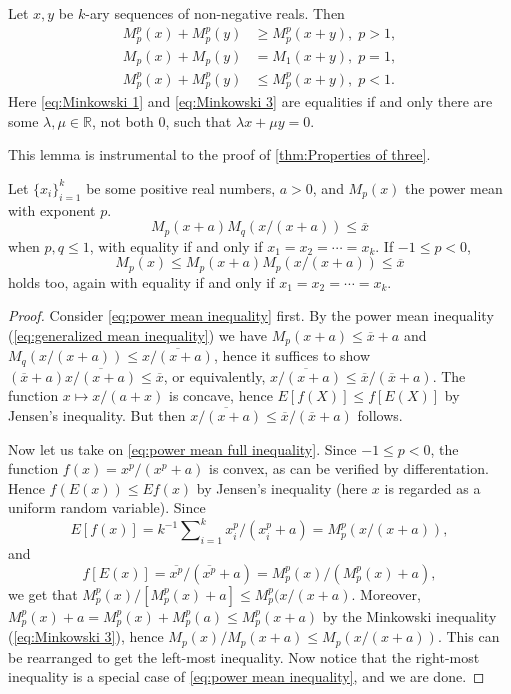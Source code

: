 \documentclass[twoside]{article}
\DeclareMathOperator{\tsum}{\textstyle \sum}
\begin{document}
\begin{thm}
\label{thm:minkowski}
Let $x,y$ be $k$-ary sequences of non-negative reals. Then
\begin{align}
M_{p}^{p}(x)+M_{p}^{p}(y) & \geq M_{p}^{p}(x+y),\;p>1,\label{eq:Minkowski 1}\\
M_{p}(x)+M_{p}(y) & =M_{1}(x+y),\;p=1,\label{eq:Minkowski 2}\\
M_{p}^{p}(x)+M_{p}^{p}(y) & \leq M_{p}^{p}(x+y),\;p<1.\label{eq:Minkowski 3}
\end{align}
Here \cref{eq:Minkowski 1} and \cref{eq:Minkowski 3} are equalities if and only there are some $\lambda,\mu\in\mathbb{R}$,
not both $0$, such that $\lambda x+\mu y=0$.
\end{thm}
This lemma is instrumental to the proof of \cref{thm:Properties of three}.
\begin{lem}
\label{lem:power mean lemma}Let $\{ x_{i}\} _{i=1}^{k}$
be some positive real numbers, $a>0$, and $M_{p}(x)$
the power mean with exponent $p$. 
\begin{equation}
M_{p}(x+a)M_{q}(x/{(x+a)})\leq\overline{x}\label{eq:power mean inequality}
\end{equation}
when $p,q\leq1$, with equality if and only if $x_{1}=x_{2}=\cdots=x_{k}$.
If $-1\leq p<0$, 
\begin{equation}
M_{p}(x)\leq M_{p}(x+a)M_{p}(x/{(x+a)})\leq\overline{x}\label{eq:power mean full inequality}
\end{equation}
holds too, again with equality if and only if $x_{1}=x_{2}=\cdots=x_{k}$.
\end{lem}
\begin{proof}
Consider \cref{eq:power mean inequality} first. By the power
mean inequality (\cref{eq:generalized mean inequality}) we have $M_{p}(x+a)\leq\overline{x}+a$ and $M_{q}(x/(x+a))\leq\overline{x/(x+a)}$,
hence it suffices to show $(\overline{x}+a)\overline{x/(x+a)}\leq\overline{x}$,
or equivalently, $\overline{x/(x+a)}\leq\overline{x}/(\overline{x}+a)$.
The function $x\mapsto x/(a+x)$ is concave, hence $E[f(X)]\leq f[E(X)]$
by Jensen's inequality. But then $\overline{x/(x+a)}\leq\overline{x}/(\overline{x}+a)$
follows.

Now let us take on \cref{eq:power mean full inequality}.
Since $-1\leq p<0$, the function $f(x)=x^{p}/(x^{p}+a)$ is convex, as can
be verified by differentation. Hence $f(E(x))\leq Ef(x)$ by Jensen's
inequality (here $x$ is regarded as a uniform random variable). Since
\[
E[f(x)]=k^{-1}\tsum_{i=1}^{k}x_{i}^{p}/(x_{i}^{p}+a)=M_{p}^{p}(x/(x+a)),
\]
and
\[
f[E(x)]=\overline{x^{p}}/(\overline{x^{p}}+a)=M_{p}^{p}(x)/(M_{p}^{p}(x)+a),
\]
we get that $M_{p}^{p}(x)/[M_{p}^{p}(x)+a]\leq M_{p}^{p}(x/(x+a)$. Moreover, $M_{p}^{p}(x)+a=M_{p}^{p}(x)+M_{p}^{p}(a)\leq M_{p}^{p}(x+a)$
by the Minkowski inequality (\cref{eq:Minkowski 3}), hence $M_{p}(x)/M_{p}(x+a)\leq M_{p}(x/(x+a))$. This can be rearranged to get the left-most inequality. 
Now notice that the right-most inequality is a special case of \cref{eq:power mean inequality}, and we are done. 
\end{proof}
\end{document}

